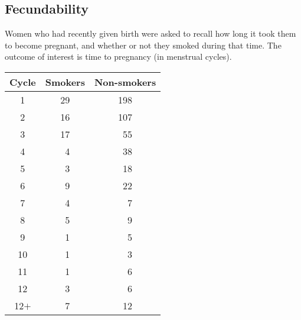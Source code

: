 \documentclass[11pt,slidesonly,semrot,portrait,palatino]{book}
\begin{document}
\subsection{Fecundability}
Women who had recently given birth were asked to
recall how long it took them to become pregnant, and whether
or not they smoked during that time.
The outcome of interest is time
to pregnancy (in menstrual cycles).
\begin{center}
\begin{tabular}{ccc}
Cycle& Smokers & Non-smokers \\ \hline
1    &  29  &     198 \\
2    &  16  &     107 \\
3    &  17  &     ~55 \\
4    &  ~4  &     ~38 \\
5    &  ~3  &     ~18 \\
6    &  ~9  &     ~22 \\
7    &  ~4  &     ~~7 \\
8    &  ~5  &     ~~9 \\
9    &  ~1  &     ~~5 \\
10   &  ~1  &     ~~3 \\
11   &  ~1  &     ~~6 \\
12   &  ~3  &     ~~6 \\
12$+$&  ~7  &     ~12 \\ \hline
 \end{tabular}
 \end{center}
\normalsize
\end{document}
